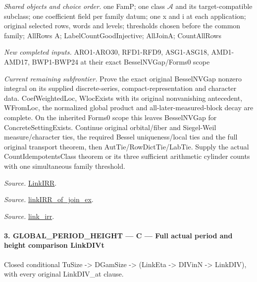 \documentclass[11pt,a4paper]{article}
\numberwithin{equation}{section}
\theoremstyle{remark}\newtheorem{remark}[theorem]{Remark}
\begin{document}
\emph{Shared objects and choice order.} one FamP; one class $\mathcal A$ and its target-compatible subclass; one coefficient field per family datum; one x and i at each application; original selected rows, words and levels; thresholds chosen before the common family; AllRows A; LabelCountGoodInjective; AllJoinA; CountAllRows

\emph{New completed inputs.} ARO1-ARO30, RFD1-RFD9, ASG1-ASG18, AMD1-AMD17, BWP1-BWP24 at their exact BesselNVGap/Forms0 scope

\emph{Current remaining subfrontier.} Prove the exact original BesselNVGap nonzero integral on its supplied discrete-series, compact-representation and character data. CoefWeightedLoc, WlocExists with its original nonvanishing antecedent, WFromLoc, the normalized global product and all-later-measured-block decay are complete. On the inherited Forms0 scope this leaves BesselNVGap for ConcreteSettingExists. Continue original orbital/fiber and Siegel-Weil measure/character ties, the required Bessel uniqueness/local ties and the full original transport theorem, then AutTie/RowDictTie/LabTie. Supply the actual CountIdempotentsClass theorem or its three sufficient arithmetic cylinder counts with one simultaneous family threshold.

\emph{Source.} \href{https://github.com/CocoSgt/riemann-hypothesis-lean/blob/7cbf7a0c32fca1badf05931879a37c3f8a2b03b4/src/Formalism/SharpRestriction/GlobalTheoremInputs.lean#L55-L58}{LinkIRR}.

\emph{Source.} \href{https://github.com/CocoSgt/riemann-hypothesis-lean/blob/7cbf7a0c32fca1badf05931879a37c3f8a2b03b4/src/Development/AbelianVarietyTheory/Proofs/GlobalInterpolation/LinkIRROfJoinEx.lean#L17-L38}{linkIRR\_\allowbreak of\_\allowbreak join\_\allowbreak ex}.

\emph{Source.} \href{https://github.com/CocoSgt/riemann-hypothesis-lean/blob/7cbf7a0c32fca1badf05931879a37c3f8a2b03b4/src/Development/AbelianVarietyTheory/Proofs/GlobalInterpolation/LinkIRROfJoinEx.lean#L143-L166}{link\_\allowbreak irr}.



\paragraph{3. GLOBAL\_\allowbreak PERIOD\_\allowbreak HEIGHT — C — Full actual period and height comparison LinkDIVt}

Closed conditional TuSize -> DGamSize -> (LinkEta -> DIVinN -> LinkDIV), with every original LinkDIV\_\allowbreak at clause.
\end{document}
